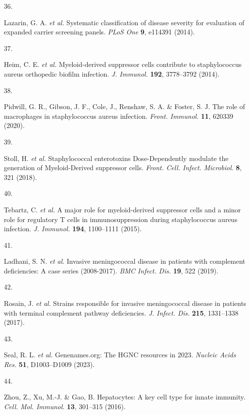 \documentclass[
]{article}
\newlength{\cslhangindent}
\newlength{\csllabelwidth}
\newenvironment{CSLReferences}[2] %
 {\begin{list}{}{%
  \setlength{\itemindent}{0pt}
  \setlength{\leftmargin}{0pt}
  \setlength{\parsep}{0pt}
  \ifodd #1
   \setlength{\leftmargin}{\cslhangindent}
   \setlength{\itemindent}{-1\cslhangindent}
  \fi
  \setlength{\itemsep}{#2\baselineskip}}}
 {\end{list}}
\newcommand{\CSLLeftMargin}[1]{\parbox[t]{\csllabelwidth}{\strut#1\strut}}
\newcommand{\CSLRightInline}[1]{\parbox[t]{\linewidth - \csllabelwidth}{\strut#1\strut}}
\begin{document}
\begin{CSLReferences}{0}{0}
\CSLLeftMargin{36. }%
\CSLRightInline{Lazarin, G. A. \emph{et al.} Systematic classification
of disease severity for evaluation of expanded carrier screening panels.
\emph{PLoS One} \textbf{9}, e114391 (2014).}

\CSLLeftMargin{37. }%
\CSLRightInline{Heim, C. E. \emph{et al.} Myeloid-derived suppressor
cells contribute to staphylococcus aureus orthopedic biofilm infection.
\emph{J. Immunol.} \textbf{192}, 3778--3792 (2014).}

\CSLLeftMargin{38. }%
\CSLRightInline{Pidwill, G. R., Gibson, J. F., Cole, J., Renshaw, S. A.
\& Foster, S. J. The role of macrophages in staphylococcus aureus
infection. \emph{Front. Immunol.} \textbf{11}, 620339 (2020).}

\CSLLeftMargin{39. }%
\CSLRightInline{Stoll, H. \emph{et al.} Staphylococcal enterotoxins
{Dose-Dependently} modulate the generation of {Myeloid-Derived}
suppressor cells. \emph{Front. Cell. Infect. Microbiol.} \textbf{8}, 321
(2018).}

\CSLLeftMargin{40. }%
\CSLRightInline{Tebartz, C. \emph{et al.} A major role for
myeloid-derived suppressor cells and a minor role for regulatory {T}
cells in immunosuppression during staphylococcus aureus infection.
\emph{J. Immunol.} \textbf{194}, 1100--1111 (2015).}

\CSLLeftMargin{41. }%
\CSLRightInline{Ladhani, S. N. \emph{et al.} Invasive meningococcal
disease in patients with complement deficiencies: A case series
(2008-2017). \emph{BMC Infect. Dis.} \textbf{19}, 522 (2019).}

\CSLLeftMargin{42. }%
\CSLRightInline{Rosain, J. \emph{et al.} Strains responsible for
invasive meningococcal disease in patients with terminal complement
pathway deficiencies. \emph{J. Infect. Dis.} \textbf{215}, 1331--1338
(2017).}

\CSLLeftMargin{43. }%
\CSLRightInline{Seal, R. L. \emph{et al.} Genenames.org: The {HGNC}
resources in 2023. \emph{Nucleic Acids Res.} \textbf{51}, D1003--D1009
(2023).}

\CSLLeftMargin{44. }%
\CSLRightInline{Zhou, Z., Xu, M.-J. \& Gao, B. Hepatocytes: A key cell
type for innate immunity. \emph{Cell. Mol. Immunol.} \textbf{13},
301--315 (2016).}


\end{CSLReferences}
\end{document}
